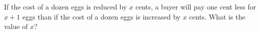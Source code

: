 If the cost of a dozen eggs is reduced by $x$ cents, a buyer will pay one cent less for $x+1$ eggs than if the cost of a dozen eggs is increased by $x$ cents. What is the value of $x$?
